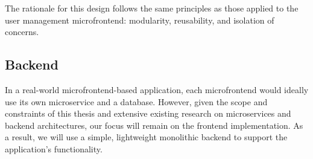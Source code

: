 The rationale for this design follows the same principles as those applied to the user management microfrontend: modularity, reusability, and isolation of concerns.

\subsection{Backend}
In a real-world microfrontend-based application, each microfrontend would ideally use its own microservice and a database. However, given the scope and constraints of this thesis and extensive existing research on microservices and backend architectures, our focus will remain on the frontend implementation. As a result, we will use a simple, lightweight monolithic backend to support the application's functionality.
